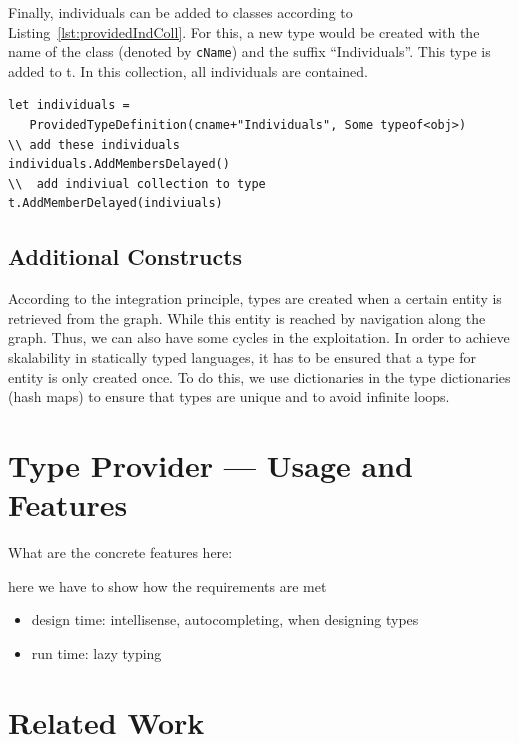 \documentclass{llncs} %
\begin{document}
Finally, individuals can be added to classes according to Listing~\ref{lst:providedIndColl}.
For this, a new type would be created with the name of the class (denoted by \texttt{cName}) and the
suffix ``Individuals''. This type is added to t. In this collection, all individuals are contained.

\begin{lstlisting}[style=code, caption={\texttt{Individual Rule:} Add Individuals (set / collection) to Class C}, label={lst:providedIndColl}]
let individuals = 
   ProvidedTypeDefinition(cname+"Individuals", Some typeof<obj>)
\\ add these individuals
individuals.AddMembersDelayed()
\\  add indiviual collection to type 
t.AddMemberDelayed(indiviuals)
 \end{lstlisting}


\subsection{Additional Constructs}

According to the integration principle, types are created when a certain entity is retrieved from the graph. While this entity is reached
by navigation along the graph. Thus, we can also have some cycles in the exploitation. In order to achieve skalability in
statically typed languages, it has to be ensured that a type for entity is only created once.
To do this, we use dictionaries in the type dictionaries (hash maps) to ensure that types are unique and to avoid infinite loops.

	
\section{Type Provider --- Usage and Features}
\label{sec:usage}

 What are the concrete features here:

here we have to show how the requirements are met


\begin{itemize}
	\item design time: intellisense, autocompleting, when designing types
  \item run time: lazy typing
\end{itemize}

 
\section{Related Work}
\label{sec:rw}
\end{document}
